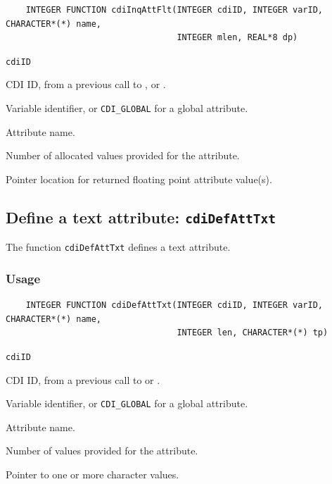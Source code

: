 \begin{verbatim}
    INTEGER FUNCTION cdiInqAttFlt(INTEGER cdiID, INTEGER varID, CHARACTER*(*) name, 
                                  INTEGER mlen, REAL*8 dp)
\end{verbatim}

\hspace*{4mm}\begin{minipage}[]{15cm}
\begin{deflist}{\texttt{cdiID}\ }
\item[\texttt{cdiID}]
CDI ID, from a previous call to {}, {} or {}.
\item[\texttt{varID}]
Variable identifier, or {\texttt{CDI\_GLOBAL}} for a global attribute.
\item[\texttt{name}]
Attribute name.
\item[\texttt{mlen}]
Number of allocated values provided for the attribute.
\item[\texttt{dp}]
Pointer location for returned floating point attribute value(s).

\end{deflist}
\end{minipage}


\subsection{Define a text attribute: \texttt{cdiDefAttTxt}}
\label{cdiDefAttTxt}

The function {\texttt{cdiDefAttTxt}} defines a text attribute.

\subsubsection*{Usage}

\begin{verbatim}
    INTEGER FUNCTION cdiDefAttTxt(INTEGER cdiID, INTEGER varID, CHARACTER*(*) name, 
                                  INTEGER len, CHARACTER*(*) tp)
\end{verbatim}

\hspace*{4mm}\begin{minipage}[]{15cm}
\begin{deflist}{\texttt{cdiID}\ }
\item[\texttt{cdiID}]
CDI ID, from a previous call to {} or {}.
\item[\texttt{varID}]
Variable identifier, or {\texttt{CDI\_GLOBAL}} for a global attribute.
\item[\texttt{name}]
Attribute name.
\item[\texttt{len}]
Number of values provided for the attribute.
\item[\texttt{tp}]
Pointer to one or more character values.

\end{deflist}
\end{minipage}


